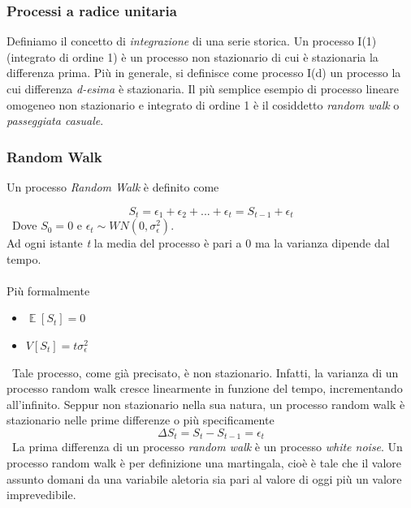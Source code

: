 \documentclass[]{article}
\DeclareMathOperator{\E}{\mathbb{E}}
\begin{document}
\subsubsection*{Processi a radice unitaria}
Definiamo il concetto di \textit{integrazione} di una serie storica.
Un processo I(1) (integrato di ordine 1) è un processo non stazionario di cui è stazionaria la differenza prima. Più in generale, si definisce come processo I(d) un processo la cui differenza \textit{d-esima} è stazionaria.
Il più semplice esempio di processo lineare omogeneo non stazionario e integrato di ordine 1 è il cosiddetto \textit{random walk} o \textit{passeggiata casuale}.

\subsubsection*{Random Walk}

Un processo \textit{Random Walk} è definito come

\begin{equation}
	S_t = \epsilon_1 + \epsilon_2 + ... + \epsilon_t = S_{t-1} + \epsilon_t
\end{equation}
\
Dove $S_0= 0$ e $\epsilon_t \sim WN(0,\sigma_{\epsilon}^2)$.
\\
Ad ogni istante \textit{t} la media del processo è pari a 0 ma la varianza dipende dal tempo. 
\\\\
Più formalmente

\begin{itemize}
	\item $\E[S_t]=0$
	\item $V[S_t]= t\sigma_{\epsilon}^2$
\end{itemize}
\
Tale processo, come già precisato, è non stazionario. Infatti, la varianza di un processo random walk cresce linearmente in funzione del tempo, incrementando all’infinito.
Seppur non stazionario nella sua natura, un processo random walk è stazionario nelle prime differenze o più specificamente
\begin{equation}
	\Delta S_t = S_t - S_{t-1} = \epsilon_t
\end{equation}
\
La prima differenza di un processo \textit{random walk} è un processo \textit{white noise}.
Un processo random walk è per definizione una martingala, cioè è  tale che il valore assunto domani da una variabile aletoria sia pari al valore di oggi più un valore imprevedibile.
\end{document}
